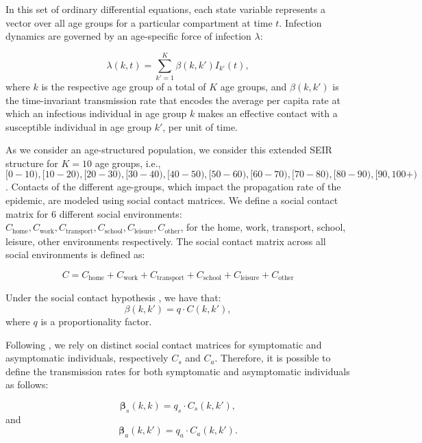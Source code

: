 \documentclass{article}
\renewcommand{\cite}[1]{\citep{#1}}
\newcommand{\foi}{\lambda}
\newcommand{\ctotal}{C}
\newcommand{\chome}{C_{\text{home}}}
\newcommand{\cwork}{C_{\text{work}}}
\newcommand{\ctransport}{C_{\text{transport}}}
\newcommand{\cschool}{C_{\text{school}}}
\newcommand{\cleisure}{C_{\text{leisure}}}
\newcommand{\cother}{C_{\text{other}}}
\newcommand{\proportionalityfactor}{q}
\newcommand{\agegroup}{k}
\newcommand{\agegroups}{K}
\begin{document}
In this set of ordinary differential equations, each state variable represents a vector over all age groups for a particular compartment at time $t$. Infection dynamics are governed by an age-specific force of infection $\foi$:

\begin{equation}
    \foi(\agegroup,t) = \sum_{\agegroup'=1}^{\agegroups}\beta(\agegroup,\agegroup')I_{\agegroup'}(t),
\end{equation}
%
where $\agegroup$ is the respective age group of a total of $\agegroups$ age groups, and $\beta(\agegroup,\agegroup')$ is the time-invariant transmission rate that encodes the average per capita rate at which an infectious individual in age group $\agegroup$ makes an effective contact with a susceptible individual in age group $\agegroup'$, per unit of time.

As we consider an age-structured population, we consider this extended SEIR structure for $\agegroups = 10$ age groups,  i.e., $[0-10), [10-20), [20-30), [30-40), [40-50), [50-60), [60-70), [70-80), [80-90), [90,100+)$. Contacts of the different age-groups, which impact the propagation rate of the epidemic, are modeled using social contact matrices. We define a social contact matrix for 6 different social environments: $\chome, \cwork, \ctransport, \cschool, \cleisure, \cother$, for the home, work, transport, school, leisure, other environments respectively. The social contact matrix across all social environments is defined as:

\begin{equation}
    \ctotal = \chome + \cwork + \ctransport + \cschool + \cleisure + \cother
\end{equation}

Under the social contact hypothesis \cite{wallinga2006using}, we have that:
%
\begin{equation}
\beta(\agegroup,\agegroup') = \proportionalityfactor \cdot \ctotal(\agegroup,\agegroup'),
\end{equation}
%
where $\proportionalityfactor$ is a proportionality factor.

Following \citet{abrams2021modelling}, we rely on distinct social contact matrices for symptomatic and asymptomatic individuals, respectively $\ctotal_{s}$ and $\ctotal_{a}$. Therefore, it is possible to define the transmission rates for both symptomatic and asymptomatic individuals as follows:

\begin{equation}
\boldsymbol{\beta}_{s}(\agegroup, \agegroup) = \proportionalityfactor_{s} \cdot C_{s}(\agegroup, \agegroup'),    
\end{equation}
and
\begin{equation}
\boldsymbol{\beta}_{a}(\agegroup, \agegroup') = \proportionalityfactor_{a} \cdot C_{a}(\agegroup, \agegroup').  
\end{equation}
\end{document}
